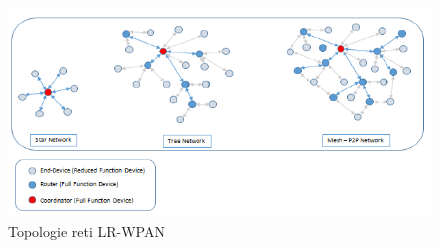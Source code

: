 \documentclass[12pt,a4paper,openright,twoside]{report}
\begin{document}
\begin{figure}[h]                      
\begin{center} 
\includegraphics[width=\textwidth]{EEE-802154-network-topologies-with-device-types.png}
\caption[Topologie reti LR-WPAN]{Topologie reti LR-WPAN}\label{fig:nona}
\end{center}
\end{figure}
\\
\\
\\
\\
\\
\\
\end{document}
